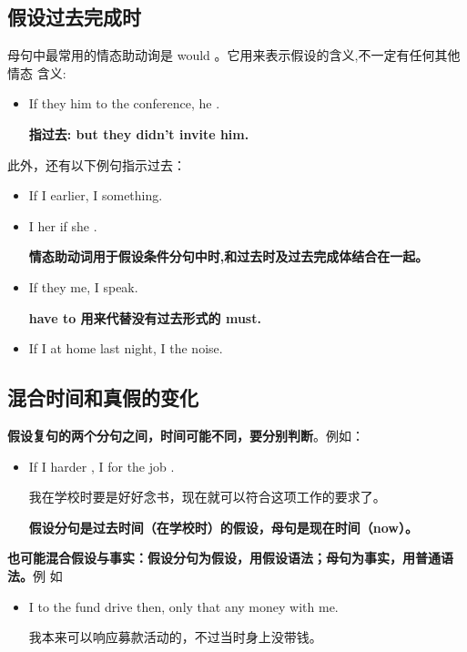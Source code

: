 \subsection{假设过去完成时}

母句中最常用的情态助动询是 would 。它用来表示假设的含义,不一定有任何其他情态
含义:
\begin{itemize}
\item If they  him to the conference, he .

  \textbf{指过去: but they didn't invite him.}
\end{itemize}

此外，还有以下例句指示过去：
\begin{itemize}
\item If I  earlier, I  something.

\item I  her if she .

  \textbf{情态助动词用于假设条件分句中时,和过去时及过去完成体结合在一起。}

\item If they  me, I  speak.

  \textbf{have to 用来代替没有过去形式的 must.}

\item If I  at home last night, I  the noise.
\end{itemize}


\subsection{混合时间和真假的变化}

\textbf{假设复句的两个分句之间，时间可能不同，要分别判断}。例如：
\begin{itemize}
\item If I  harder , I  for the job
  .

  我在学校时要是好好念书，现在就可以符合这项工作的要求了。

  \textbf{假设分句是过去时间（在学校时）的假设，母句是现在时间（now）。}
\end{itemize}

\textbf{也可能混合假设与事实：假设分句为假设，用假设语法；母句为事实，用普通语法。}例
如

\begin{itemize}
\item I  to the fund drive then, only that  any money with me.

  我本来可以响应募款活动的，不过当时身上没带钱。
\end{itemize}

